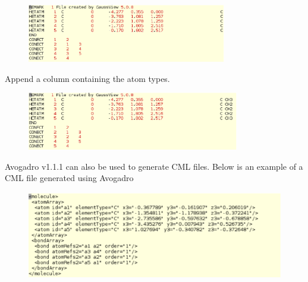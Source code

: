 %
%
%
%
%

\begin{figure}[h]
\begin{center}
\includegraphics[height=1in]{pdbfile_final.eps}
\end{center}
\end{figure}

Append a column containing the atom types.

\begin{figure}[h]
\begin{center}
\includegraphics[height=1in]{pdbfile_edited_final.eps}
\end{center}
\end{figure}

Avogadro v1.1.1 can also be used to generate CML files. Below is an example of a 
CML file generated using Avogadro

\begin{figure}[h]
\begin{center}
\includegraphics[height=1.5in]{pentane_cml.eps}
\end{center}
\end{figure}

